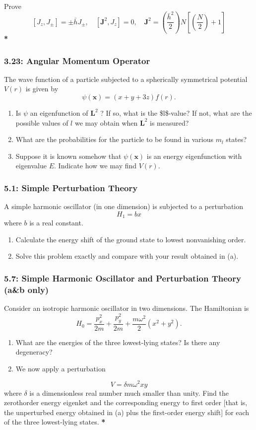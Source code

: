 \documentclass[11pt]{article}
\begin{document}
Prove $$ \left[J_z, J_{ \pm}\right]= \pm \bar{h} J_{ \pm},
\quad\left[\mathbf{J}^2, J_z\right]=0, \quad
\mathbf{J}^2=\left(\frac{\bar{h}^2}{2}\right)
N\left[\left(\frac{N}{2}\right)+1\right] $$
\textbf{*}
\subsubsection{3.23: Angular Momentum Operator}
\label{sec:orgf4fc91f}
The wave function of a particle subjected to a spherically symmetrical
potential \(V(r)\) is given by $$ \psi(\mathbf{x})=(x+y+3 z) f(r) . $$
\begin{enumerate}
\item Is \(\psi\) an eigenfunction of \(\mathbf{L}^2\) ? If so, what is the \$l\$-value?
If not, what are the possible values of \(l\) we may obtain when \(\mathbf{L}^2\)
is measured?
\item What are the probabilities for the particle to be found in various \(m_l\)
states?
\item Suppose it is known somehow that \(\psi(\mathbf{x})\) is an energy
eigenfunction with eigenvalue \(E\). Indicate how we may find \(V(r)\).
\end{enumerate}
\subsubsection{5.1: Simple Perturbation Theory}
\label{sec:org449fd35}
A simple harmonic oscillator (in one dimension) is subjected to a perturbation
$$
H_1=b x
$$
where \(b\) is a real constant.
\begin{enumerate}
\item Calculate the energy shift of the ground state to lowest nonvanishing order.
\item Solve this problem exactly and compare with your result obtained in (a).
\end{enumerate}
\subsubsection{5.7: Simple Harmonic Oscillator and Perturbation Theory (a\&b only)}
\label{sec:org24f534e}
Consider an isotropic harmonic oscillator in two dimensions. The Hamiltonian is
$$ H_0=\frac{p_x^2}{2 m}+\frac{p_y^2}{2 m}+\frac{m
\omega^2}{2}\left(x^2+y^2\right) . $$
\begin{enumerate}
\item What are the energies of the three lowest-lying states? Is there any
degeneracy?
\item We now apply a perturbation
\end{enumerate}
$$ V=\delta m \omega^2 x y $$ where \(\delta\) is a dimensionless real number much
smaller than unity. Find the zerothorder energy eigenket and the corresponding
energy to first order [that is, the unperturbed energy obtained in (a) plus the
first-order energy shift] for each of the three lowest-lying states.
\textbf{*}
\end{document}
